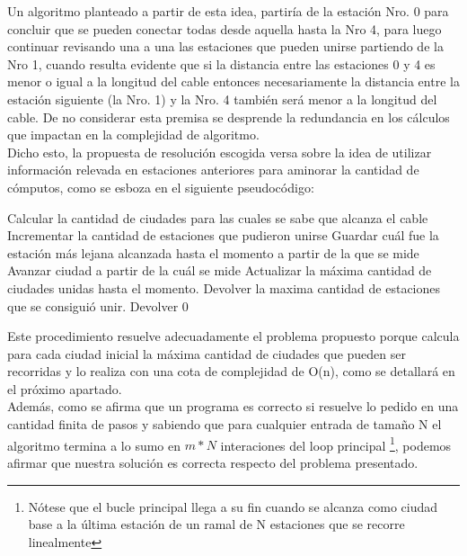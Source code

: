 Un algoritmo planteado a partir de esta idea, partiría de la estación Nro. 0 para concluir que se pueden conectar todas desde aquella hasta la Nro 4, para luego continuar revisando una a una las estaciones que pueden unirse partiendo de la Nro 1, cuando resulta evidente que si la distancia entre las estaciones  0 y 4 es menor o igual a la longitud del cable entonces necesariamente la distancia entre la estación siguiente (la Nro. 1) y la Nro. 4 también será menor a la longitud del cable. De no considerar esta premisa se desprende la redundancia en los cálculos que impactan en la complejidad de algoritmo. \\
 
Dicho esto, la propuesta de resolución escogida versa sobre la idea de utilizar información relevada en estaciones anteriores para aminorar la cantidad de cómputos, como se esboza en el siguiente pseudocódigo:


\begin{algorithmic} 
	
		\STATE Calcular la cantidad de ciudades para las cuales se sabe que alcanza el cable
			\STATE Incrementar la cantidad de estaciones que pudieron unirse
			\STATE Guardar cuál fue la estación más lejana alcanzada hasta el momento a partir de la que se mide
		\ENDWHILE
		\STATE Avanzar ciudad a partir de la cuál se mide
		\STATE Actualizar la máxima cantidad de ciudades unidas hasta el momento.
	\ENDWHILE
		\STATE Devolver la maxima cantidad de estaciones que se consiguió unir.
	\ELSE
		\STATE Devolver 0
	\ENDIF
\ENDIF
\end{algorithmic}

Este procedimiento resuelve adecuadamente el problema propuesto porque calcula para cada ciudad inicial la máxima cantidad de ciudades que pueden ser recorridas y lo realiza con una cota de complejidad de O(n), como se detallará en el próximo apartado.\\
Además, como se afirma que un programa es correcto si resuelve lo pedido en una cantidad finita de pasos y sabiendo que para cualquier entrada de tama\~no N el algoritmo termina a lo sumo en $m*N$ interaciones del loop principal \footnote{Nótese que el bucle principal llega a su fin cuando se alcanza como ciudad base a la última estación de un ramal de N estaciones que se recorre linealmente}, podemos afirmar que nuestra solución es correcta respecto del problema presentado.\\


